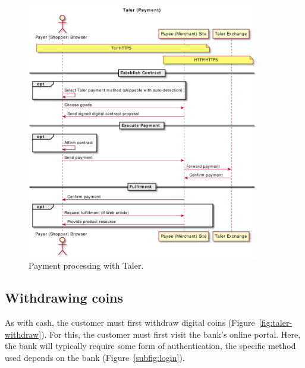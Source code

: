 \documentclass{llncs}
\begin{document}
\begin{figure}[t!]
\includegraphics[width=0.9\textwidth]{figs/taler-pay.pdf}
\caption{Payment processing with Taler.}
\label{fig:taler-pay}
\end{figure}


\subsection{Withdrawing coins}

As with cash, the customer must first withdraw digital coins
(Figure~\ref{fig:taler-withdraw}).  For this, the customer must first
visit the bank's online portal.  Here, the bank will
typically require some form of authentication, the specific method
used depends on the bank (Figure~\ref{subfig:login}).
\end{document}
